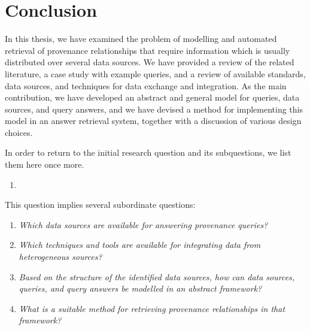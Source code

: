 \chapter{Conclusion}
\label{chap:conclusion}

In this thesis, we have examined the problem of modelling and automated retrieval of provenance relationships
that require information which is usually distributed over several data sources.
We have provided a review of the related literature,
a case study with example queries, and a review of available standards, data sources,
and techniques for data exchange and integration.
As the main contribution, we have developed an abstract and general model for queries,
data sources, and query answers, and we have devised a method for implementing this model
in an answer retrieval system, together with a discussion of various design choices.

In order to return to the initial research question and its subquestions,
we list them here once more.
\begin{mdframed}[
  linewidth=1pt,
  linecolor=black!50,
  innerleftmargin=0pt,innerrightmargin=0pt,
  leftline=false,rightline=false
]
  \begin{enumerate}
    \item[\RQ\phantom{\mybold{1}}]
  \end{enumerate}
\end{mdframed}
%
This question implies several subordinate questions:
%
\begin{mdframed}[
  linewidth=1pt,
  linecolor=black!50,
  innerleftmargin=0pt,innerrightmargin=0pt,
  leftline=false,rightline=false
]
  \begin{enumerate}
    \item[\subquestion{1}]
      \emph{Which data sources are available for answering provenance queries?}
    \item[\subquestion{2}]
      \emph{Which techniques and tools are available for integrating
      data from heterogeneous sources?}
    \item[\subquestion{3}]
      \emph{Based on the structure of the identified data sources,
      how can data sources, queries, and query answers be modelled in an abstract framework?}
    \item[\subquestion{4}]
      \emph{What is a suitable method for retrieving provenance relationships
      in that framework?}
  \end{enumerate}
\end{mdframed}



